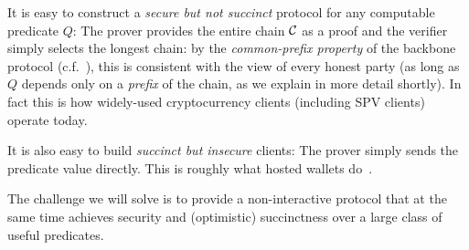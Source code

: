 It is easy to construct a \emph{secure but not succinct} protocol for any
computable predicate $Q$: The prover provides the entire chain $\mathcal{C}$ as a
proof and the verifier simply selects the longest chain: by the
\emph{common-prefix property} of the backbone protocol (c.f.~\cite{backbone}),
this is consistent with the view of every honest party (as long as $Q$ depends
only on a \emph{prefix} of the chain, as we explain in more detail shortly). In
fact this is how widely-used cryptocurrency clients (including SPV clients)
operate today.

It is also easy to build \emph{succinct but insecure} clients: The prover simply
sends the predicate value directly. This is roughly what hosted wallets
do~\cite{sok}.

The challenge we will solve is to provide a non-interactive protocol that at the
same time achieves security and (optimistic) succinctness over a large class of
useful predicates.
